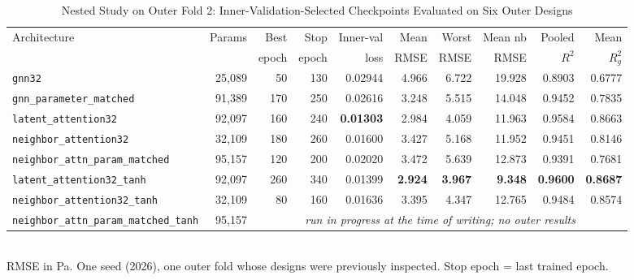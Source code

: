 \documentclass[journal]{IEEEtran}
\begin{document}
\begin{table}[!t]
\centering
\caption{Nested Study on Outer Fold 2: Inner-Validation-Selected Checkpoints Evaluated on Six Outer Designs}
\label{tab:nested}
\begin{tabular}{lrrrrrrrrr}
\toprule
Architecture & Params & Best & Stop & Inner-val & Mean & Worst & Mean nb & Pooled & Mean \\
 & & epoch & epoch & loss & RMSE & RMSE & RMSE & $R^2$ & $R^2_g$ \\
\midrule
\texttt{gnn32} & 25{,}089 & 50 & 130 & 0.02944 & 4.966 & 6.722 & 19.928 & 0.8903 & 0.6777 \\
\texttt{gnn\_parameter\_matched} & 91{,}389 & 170 & 250 & 0.02616 & 3.248 & 5.515 & 14.048 & 0.9452 & 0.7835 \\
\texttt{latent\_attention32} & 92{,}097 & 160 & 240 & \textbf{0.01303} & 2.984 & 4.059 & 11.963 & 0.9584 & 0.8663 \\
\texttt{neighbor\_attention32} & 32{,}109 & 180 & 260 & 0.01600 & 3.427 & 5.168 & 11.952 & 0.9451 & 0.8146 \\
\texttt{neighbor\_attn\_param\_matched} & 95{,}157 & 120 & 200 & 0.02020 & 3.472 & 5.639 & 12.873 & 0.9391 & 0.7681 \\
\midrule
\texttt{latent\_attention32\_tanh} & 92{,}097 & 260 & 340 & 0.01399 & \textbf{2.924} & \textbf{3.967} & \textbf{9.348} & \textbf{0.9600} & \textbf{0.8687} \\
\texttt{neighbor\_attention32\_tanh} & 32{,}109 & 80 & 160 & 0.01636 & 3.395 & 4.347 & 12.765 & 0.9484 & 0.8574 \\
\texttt{neighbor\_attn\_param\_matched\_tanh} & 95{,}157 & \multicolumn{8}{c}{\emph{run in progress at the time of writing; no outer results}} \\
\bottomrule
\end{tabular}\\[2pt]
\footnotesize RMSE in Pa. One seed (2026), one outer fold whose designs were previously inspected. Stop epoch = last trained epoch.
\end{table}
\end{document}
